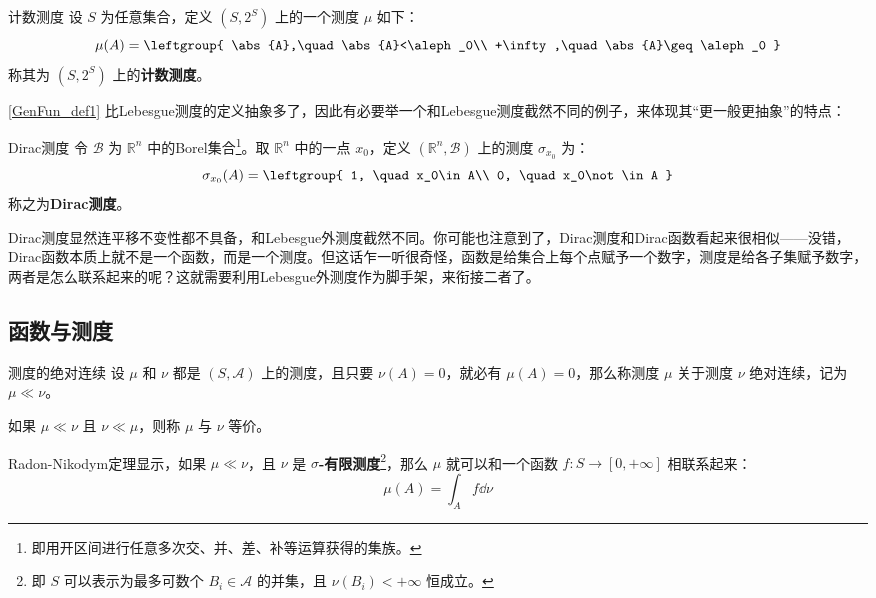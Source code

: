 \begin{example}{计数测度}
设 $S$ 为任意集合，定义 $(S, 2^S)$ 上的一个测度 $\mu$ 如下：
\begin{equation}
\mu(A)=
\leftgroup{
    \abs{A},\quad \abs{A}<\aleph_0\\
    +\infty,\quad \abs{A}\geq\aleph_0
}
\end{equation}
称其为 $(S, 2^S)$ 上的\textbf{计数测度}。
\end{example}

\autoref{GenFun_def1} 比Lebesgue测度的定义抽象多了，因此有必要举一个和Lebesgue测度截然不同的例子，来体现其“更一般更抽象”的特点：

\begin{example}{Dirac测度}
令 $\mathcal{B}$ 为 $\mathbb{R}^n$ 中的Borel集合\footnote{即用开区间进行任意多次交、并、差、补等运算获得的集族。}。取 $\mathbb{R}^n$ 中的一点 $x_0$，定义 $(\mathbb{R}^n, \mathcal{B})$ 上的测度 $\sigma_{x_0}$ 为：
\begin{equation}
\sigma_{x_0}(A)=\leftgroup{
    1, \quad x_0\in A\\
    0, \quad x_0\not\in A
}
\end{equation}
称之为\textbf{Dirac测度}。
\end{example}

Dirac测度显然连平移不变性都不具备，和Lebesgue外测度截然不同。你可能也注意到了，Dirac测度和Dirac函数看起来很相似——没错，Dirac函数本质上就不是一个函数，而是一个测度。但这话乍一听很奇怪，函数是给集合上每个点赋予一个数字，测度是给各子集赋予数字，两者是怎么联系起来的呢？这就需要利用Lebesgue外测度作为脚手架，来衔接二者了。





\subsection{函数与测度}




\begin{definition}{测度的绝对连续}
设 $\mu$ 和 $\nu$ 都是 $(S, \mathcal{A})$ 上的测度，且只要 $\nu(A)=0$，就必有 $\mu(A)=0$，那么称测度 $\mu$ 关于测度 $\nu$ 绝对连续，记为 $\mu\ll\nu$。

如果 $\mu\ll\nu$ 且 $\nu\ll\mu$，则称 $\mu$ 与 $\nu$ 等价。
\end{definition}



Radon-Nikodym定理显示，如果 $\mu\ll\nu$，且 $\nu$ 是 $\sigma$\textbf{-有限测度}\footnote{即 $S$ 可以表示为最多可数个 $B_i\in\mathcal{A}$ 的并集，且 $\nu(B_i)<+\infty$ 恒成立。}，那么 $\mu$ 就可以和一个函数 $f:S\to [0, +\infty]$ 相联系起来：
\begin{equation}
\mu(A) = \int_A f \dd \nu
\end{equation}


